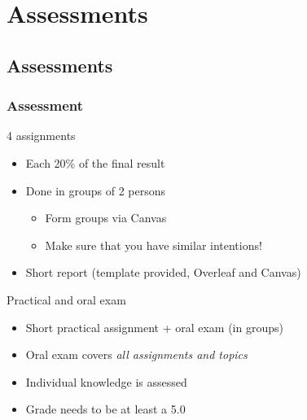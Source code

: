 \section{Assessments}
\subsection{Assessments}
\begin{frame}
 \frametitle{Assessment}
 \begin{block}{4 assignments}
  \begin{itemize}
    \item Each 20\% of the final result
    \item Done in groups of 2 persons
    \begin{itemize}
      \item Form groups via Canvas
      \item Make sure that you have similar intentions!
    \end{itemize}
    \item Short report (template provided, Overleaf and Canvas)
  \end{itemize}   
 \end{block}
 \pause
 \begin{block}{Practical and oral exam}
  \begin{itemize}
    \item Short practical assignment + oral exam (in groups)
    \item Oral exam covers \emph{all assignments and topics}
    \item Individual knowledge is assessed
    \item Grade needs to be at least a 5.0
  \end{itemize}   
 \end{block}
\end{frame}

